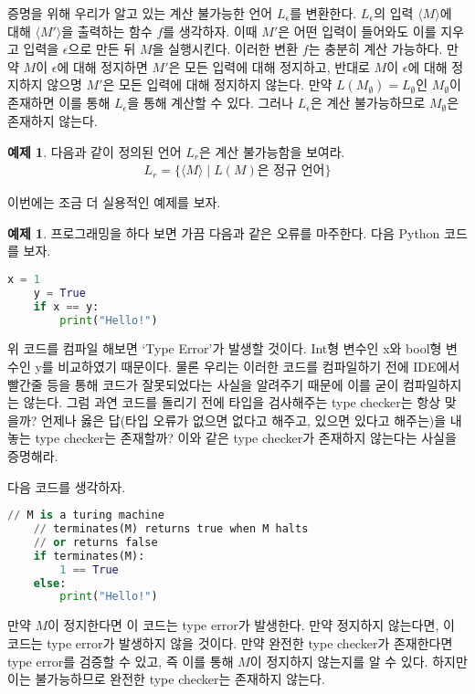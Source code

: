 \documentclass[b5paper, 10pt]{book}
\theoremstyle{definition}
\newtheorem{ex}[defn]{예제}
\newenvironment{pf*}{\pushQED{\qed}\pf}{\popQED\endpf}
\begin{document}
\begin{pf*}
    증명을 위해 우리가 알고 있는 계산 불가능한 언어 $L_\epsilon$를 변환한다. 
    $L_\epsilon$의 입력 $\langle M \rangle$에 대해 $\langle M' \rangle$을 
    출력하는 함수 $f$를 생각하자. 이때 $M'$은 어떤 입력이 들어와도 이를 지우고
    입력을 $\epsilon$으로 만든 뒤 $M$을 실행시킨다. 이러한 변환 $f$는 충분히
    계산 가능하다. 만약 $M$이 $\epsilon$에 대해 정지하면 $M'$은 모든 입력에 대해
    정지하고, 반대로 $M$이 $\epsilon$에 대해 정지하지 않으명 $M'$은 모든 입력에
    대해 정지하지 않는다. 만약 $L(M_\emptyset) = L_\emptyset$인 $M_\emptyset$이
    존재하면 이를 통해 $L_\epsilon$을 통해 계산할 수 있다. 그러나 $L_\epsilon$은
    계산 불가능하므로 $M_\emptyset$은 존재하지 않는다.
\end{pf*}
\begin{ex}
    다음과 같이 정의된 언어 $L_r$은 계산 불가능함을 보여라.
    \begin{align*}
        L_r = \{ \langle M \rangle \;\vert\; L(M) \text{은 정규 언어} \}
    \end{align*}
\end{ex}
이번에는 조금 더 실용적인 예제를 보자. 
\begin{ex}
    프로그래밍을 하다 보면 가끔 다음과 같은 오류를 마주한다. 다음 Python 코드를 보자.
\begin{lstlisting}[language=Python]
    x = 1 
    y = True
    if x == y:
        print("Hello!")
\end{lstlisting}
    위 코드를 컴파일 해보면 `Type Error'가 발생할 것이다. Int형 변수인 x와 bool형 변수인 y를 
    비교하였기 때문이다. 물론 우리는 이러한 코드를 컴파일하기 전에 IDE에서 빨간줄 등을 통해 코드가 
    잘못되었다는 사실을 알려주기 때문에 이를 굳이 컴파일하지는 않는다. 그럼 과연 코드를 돌리기 전에
    타입을 검사해주는 type checker는 항상 맞을까? 언제나 옳은 답(타입 오류가 없으면 없다고 해주고, 
    있으면 있다고 해주는)을 내놓는 type checker는 존재할까? 이와 같은 type checker가 존재하지 않는다는
    사실을 증명해라. 
\end{ex}
\begin{pf*}
    다음 코드를 생각하자. 
\begin{lstlisting}[language=Python]
    // M is a turing machine
    // terminates(M) returns true when M halts
    // or returns false 
    if terminates(M):
        1 == True 
    else:
        print("Hello!")
\end{lstlisting}
만약 $M$이 정지한다면 이 코드는 type error가 발생한다. 만약 정지하지 않는다면, 이 코드는 type error가
발생하지 않을 것이다. 만약 완전한 type checker가 존재한다면 type error를 검증할 수 있고, 즉 이를 통해 
$M$이 정지하지 않는지를 알 수 있다. 하지만 이는 불가능하므로 완전한 type checker는 존재하지 않는다. 
\end{pf*}
\end{document}
